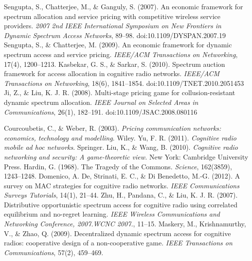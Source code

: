 \begin{thebibliography}{}
 Sengupta, S., Chatterjee, M., \& Ganguly, S. (2007). An economic framework for spectrum allocation and service pricing with competitive wireless service providers. \textit{2007 2nd IEEE International Symposium on New Frontiers in Dynamic Spectrum Access Networks}, 89–98. doi:10.1109/DYSPAN.2007.19
 Sengupta, S., \& Chatterjee, M. (2009). An economic framework for dynamic spectrum access and service pricing.\textit{ IEEE/ACM Transactions on Networking}, 17(4), 1200–1213.	
 Kasbekar, G. S., \& Sarkar, S. (2010). Spectrum auction framework for access allocation in cognitive radio networks. \textit{IEEE/ACM Transactions on Networking}, 18(6), 1841–1854. doi:10.1109/TNET.2010.2051453	
 Ji, Z., \& Liu, K. J. R. (2008). Multi-stage pricing game for collusion-resistant dynamic spectrum allocation. \textit{IEEE Journal on Selected Areas in Communications}, 26(1), 182–191. doi:10.1109/JSAC.2008.080116

 Courcoubetis, C., \& Weber, R. (2003). \textit{Pricing communication networks: economics, technology and modelling}. Wiley.
 Yu, F. R. (2011). \textit{Cognitive radio mobile ad hoc networks}.  Springer.
 Liu, K., \& Wang, B. (2010). \textit{Cognitive radio networking and security: A game-theoretic view.} New York: Cambridge University Press.
 Hardin, G. (1968). The Tragedy of the Commons. \textit{Science}, 162(3859), 1243–1248.
 Domenico, A. De, Strinati, E. C., \& Di Benedetto, M.-G. (2012). A survey on MAC strategies for cognitive radio networks. \textit{IEEE Communications Surveys Tutorials}, 14(1), 21–44.
 Zhu, H., Pandana, C., \& Liu, K. J. R. (2007). Distributive opportunistic spectrum access for cognitive radio using correlated equilibrium and no-regret learning. \textit{IEEE Wireless Communications and Networking Conference, 2007.WCNC 2007.}, 11–15.
 Maskery, M., Krishnamurthy, V., \& Zhao, Q. (2009). Decentralized dynamic spectrum access for cognitive radios: cooperative design of a non-cooperative game. \textit{IEEE Transactions on Communications}, 57(2), 459–469.


\end{thebibliography}
